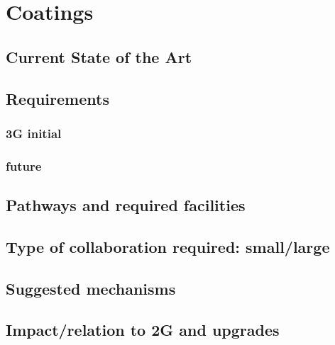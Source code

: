 \section{Coatings}
\subsection{Current State of the Art}
\subsection{Requirements}
\subsubsection{3G initial}
\subsubsection{future}
\subsection{Pathways and required facilities}
\subsection{Type of collaboration required:  small/large}
\subsection{Suggested mechanisms}
\subsection{Impact/relation to 2G and upgrades}